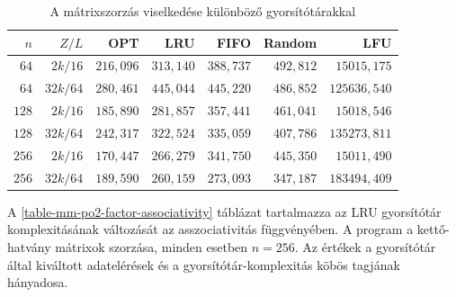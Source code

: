 \documentclass[12pt]{report}
\begin{document}
\begin{table}[ht]
\centering
\caption{A mátrixszorzás viselkedése különböző gyorsítótárakkal}
\label{table-mm-po2-factor}
\begin{tabular}{|r|r|r|r|r|r|r|}
\hline
$n$ & $Z/L$ & OPT & LRU & FIFO & Random & LFU \\
\hline
 $64$ &  $2k/16$ & $216,096$ & $313,140$ & $388,737$ & $492,812$ & $15015,175$ \\
\hline
 $64$ & $32k/64$ & $280,461$ & $445,044$ & $445,220$ & $486,852$ & $125636,540$ \\
\hline
$128$ &  $2k/16$ & $185,890$ & $281,857$ & $357,441$ & $461,041$ & $15018,546$ \\
\hline
$128$ & $32k/64$ & $242,317$ & $322,524$ & $335,059$ & $407,786$ & $135273,811$ \\
\hline
$256$ &  $2k/16$ & $170,447$ & $266,279$ & $341,750$ & $445,350$ & $15011,490$ \\
\hline
$256$ & $32k/64$ & $189,590$ & $260,159$ & $273,093$ & $347,187$ & $183494,409$ \\
\hline
\end{tabular}
\end{table}

A \ref{table-mm-po2-factor-associativity} táblázat tartalmazza
az LRU gyorsítótár komplexitásának változását az asszociativitás függvényében.
A program a kettő-hatvány mátrixok szorzása, minden esetben $n=256$.
Az értékek a gyorsítótár által kiváltott adatelérések
és a gyorsítótár-komplexitás köbös tagjának hányadosa.
\end{document}
